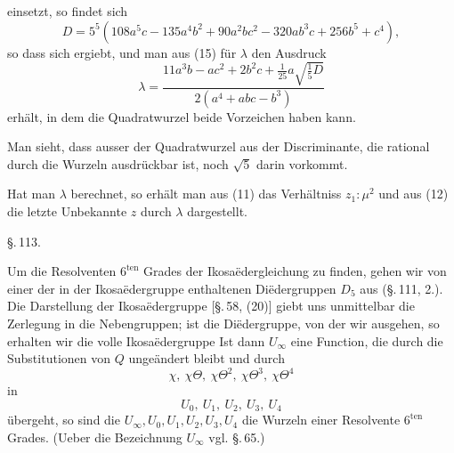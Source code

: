 einsetzt, so findet sich
\[
D = 5^5(108a^5c-135a^4b^2+90a^2bc^2 - 320ab^3c+256b^5+c^4),
\]
so dass sich
ergiebt, und man aus (15) f\"ur $\lambda$ den Ausdruck
\[
\lambda = \frac{11a^3b - ac^2 + 2b^2c + \frac{1}{25}a\sqrt{\frac{1}{5}D}}{2(a^4+abc-b^3)}
\]
erh\"alt, in dem die Quadratwurzel beide Vorzeichen haben kann.

Man sieht, dass ausser der Quadratwurzel aus der Discriminante, die rational durch die Wurzeln ausdr\"uckbar ist, noch $\sqrt5$ darin vorkommt.

Hat man $\lambda$ berechnet, so erh\"alt man aus (11) das Verh\"altniss $z_1:\mu^2$ und aus (12) die letzte Unbekannte $z$  durch $\lambda$ dargestellt.

\begin{center}
\S.\,113.

\end{center}

Um die Resolventen $6^{\mathrm{ten}}$ Grades der Ikosa\"edergleichung zu finden, gehen wir von einer der in der Ikosa\"edergruppe enthaltenen Di\"edergruppen $D_5$ aus (\S.\,111, 2.). Die Darstellung der Ikosa\"edergruppe [\S.\,58, (20)] giebt uns unmittelbar die Zerlegung in die Nebengruppen; ist
die Di\"edergruppe, von der wir ausgehen, so erhalten wir die volle Ikosa\"edergruppe
Ist dann $U_\infty$ eine Function, die durch die Substitutionen von $Q$ unge\"andert bleibt und durch
\[
\chi,\ \chi\Theta,\ \chi\Theta^2,\ \chi\Theta^3,\ \chi\Theta^4
\]
in
\[
U_0,\ U_1,\ U_2,\ U_3,\ U_4
\]
\"ubergeht, so sind die $U_\infty, U_0, U_1, U_2, U_3, U_4$ die Wurzeln einer Resolvente $6^{\mathrm{ten}}$ Grades. (Ueber die Bezeichnung $U_\infty$ vgl. \S.\,65.)
